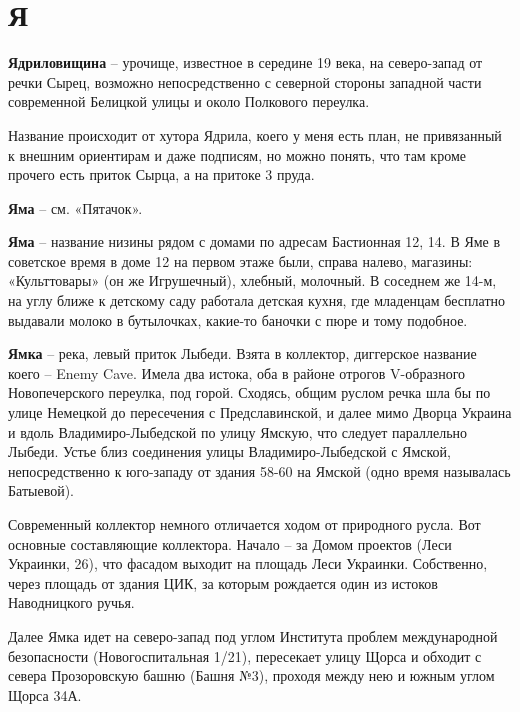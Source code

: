 \chapter*{Я}

\textbf{Ядриловищина} – урочище, известное в середине 19 века, на северо-запад от речки Сырец, возможно непосредственно с северной стороны западной части современной Белицкой улицы и около Полкового переулка.

Название происходит от хутора Ядрила, коего у меня есть план, не привязанный к внешним ориентирам и даже подписям, но можно понять, что там кроме прочего есть приток Сырца, а на притоке 3 пруда.\\

\medskip


\textbf{Яма} – см. «Пятачок».\\

\medskip

\textbf{Яма} – название низины рядом с домами по адресам Бастионная 12, 14. В Яме в советское время в доме 12 на первом этаже были, справа налево, магазины: «Культтовары» (он же Игрушечный), хлебный, молочный. В соседнем же 14-м, на углу ближе к детскому саду работала детская кухня, где младенцам бесплатно выдавали молоко в бутылочках, какие-то баночки с пюре и тому подобное.\\

\medskip

\textbf{Ямка} – река, левый приток Лыбеди. Взята в коллектор, диггерское название коего – Enemy Cave. Имела два истока, оба в районе отрогов V-образного Новопечерского переулка, под горой. Сходясь, общим руслом речка шла бы по улице Немецкой до пересечения с Предславинской, и далее мимо Дворца Украина и вдоль Владимиро-Лыбедской по улицу Ямскую, что следует параллельно Лыбеди. Устье близ соединения улицы Владимиро-Лыбедской с Ямской, непосредственно к юго-западу от здания 58-60 на Ямской (одно время называлась Батыевой).

Современный коллектор немного отличается ходом от природного русла. Вот основные составляющие коллектора. Начало – за Домом проектов (Леси Украинки, 26), что фасадом выходит на площадь Леси Украинки. Собственно, через площадь от здания ЦИК, за которым рождается один из истоков Наводницкого ручья.

Далее Ямка идет на северо-запад под углом Института проблем международной безопасности (Новогоспитальная 1/21), пересекает улицу Щорса и обходит с севера Прозоровскую башню (Башня №3), проходя между нею и южным углом Щорса 34А. 

